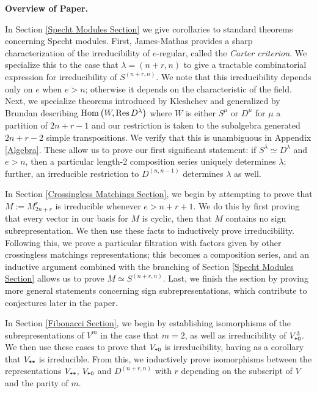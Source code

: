 \documentclass{amsart}
\newcommand{\fakesubsection}[1]{
    \vspace{7pt}
    \noindent \textbf{#1.}
  }
\begin{document}
  \fakesubsection{Overview of Paper}
  In Section \ref{Specht Modules Section} we give corollaries to standard theorems concerning Specht modules.
  First, James-Mathas provides a sharp characterization of the irreducibility of $e$-regular, called the \emph{Carter criterion}.\cite{Mathas-book}
  We specialize this to the case that $\lambda = (n+r,n)$ to give a tractable combinatorial expression for irreducibility of $S^{(n+r,n)}$.
  We note that this irreducibility depends only on $e$ when $e > n$;
  otherwise it depends on the characteristic of the field.
  Next, we specialize theorems introduced by Kleshchev and generalized by Brundan describing $\text{Hom} \left( W, \text{Res} \, D^\lambda \right)$ where $W$ is either $S^\mu$ or $D^\mu$ for $\mu$ a partition of $2n + r - 1$ and our restriction is taken to the subalgebra generated $2n + r - 2$ simple transpositions.\cite{Kleshchev}\cite{Brundan}
  We verify that this is unambiguous in Appendix \ref{Algebra}.
  These allow us to prove our first significant statement: if $S^\lambda \simeq D^\lambda$ and $e > n$, then a particular length-2 composition series uniquely determines $\lambda$;
  further, an irreducible restriction to $D^{(n,n-1)}$ determines $\lambda$ as well.

  In Section \ref{Crossingless Matchings Section}, we begin by attempting to prove that $M := M_{2n + r}^r$ is irreducible whenever $e > n+r+1$.
  We do this by first proving that every vector in our basis for $M$ is cyclic, then that $M$ contains no sign subrepresentation.
  We then use these facts to inductively prove irreducibility.
  Following this, we prove a particular filtration with factors given by other crossingless matchings representations;
  this becomes a composition series, and an inductive argument combined with the branching of Section \ref{Specht Modules Section} allows us to prove $M \simeq S^{(n+r,n)}$.
  Last, we finish the section by proving more general statements concerning sign subrepresentations, which contribute to conjectures later in the paper.

  In Section \ref{Fibonacci Section}, we begin by establishing isomorphisms of the subrepresentations of $V^m$ in the case that $m = 2$, as well as irreducibility of $V^3_{\texttt{*}\texttt{0}}$.
  We then use these cases to prove that $V_{\texttt{*}\texttt{0}}$ is irreducibility, having as a corollary that $V_{\texttt{*}\texttt{*}}$ is irreducible.
  From this, we inductively prove isomorphisms between the representations $V_{\texttt{*}\texttt{*}}$, $V_{\texttt{*}\texttt{0}}$ and $D^{(n+r,n)}$ with $r$ depending on the subscript of $V$ and the parity of $m$.
\end{document}
